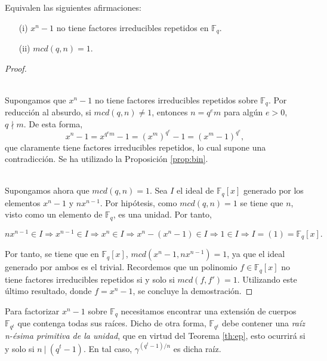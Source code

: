\begin{proposicion}
Equivalen las siguientes afirmaciones:
\begin{enumerate}
    \item[(i)]$x^n-1$ no tiene factores irreducibles repetidos en $\mathbb{F}_q$.
    \item[(ii)] $mcd(q,n) = 1$.
\end{enumerate}
\end{proposicion}

\begin{proof}
   \phantom{a}\\ \\  

    Supongamos que $x^n-1$ no tiene factores irreducibles repetidos sobre $\mathbb{F}_q$. Por reducción al absurdo, si $mcd(q,n) \neq 1$, entonces $n = q^em$ para algún $e > 0$, $q \nmid m$. De esta forma, 
    $$x^n - 1 = x^{q^em} - 1 = (x^{m})^{q^e} - 1 = (x^m - 1)^{q^e},$$ que claramente tiene factores irreducibles repetidos, lo cual supone una contradicción. Se ha utilizado la Proposición \ref{prop:bin}.
    \phantom{a}\\ \\  

    Supongamos ahora que $mcd(q,n) = 1$. Sea $I$ el ideal de $\mathbb{F}_q[x]$ generado por los elementos $x^n - 1$ y $nx^{n-1}$. Por hipótesis, como $mcd(q,n) = 1$ se tiene que $n$, visto como un elemento de $\mathbb{F}_q$, es una unidad. Por tanto,

    $$nx^{n-1} \in I \Rightarrow x^{n-1} \in I \Rightarrow x^{n} \in I \Rightarrow x^n - (x^n - 1) \in I \Rightarrow 1 \in I \Rightarrow I = (1) =\mathbb{F}_q[x] .$$

    Por tanto, se tiene que en $\mathbb{F}_q[x]$, $mcd(x^n-1,nx^{n-1}) = 1$, ya que el ideal generado por ambos es el trivial. Recordemos que un polinomio $f\in \mathbb{F}_q[x]$ no tiene factores irreducibles repetidos si y solo si $mcd(f,f') = 1$. Utilizando este último resultado, donde $f = x^n - 1$, se concluye la demostración.

\end{proof}

Para factorizar $x^n - 1$ sobre $\mathbb{F}_q$ necesitamos encontrar una extensión de cuerpos $\mathbb{F}_{q^t}$ que contenga todas sus raíces. Dicho de otra forma, $\mathbb{F}_{q^t}$ debe contener una \emph{raíz n-ésima primitiva de la unidad}, que en virtud del Teorema \ref{th:ep}, esto ocurrirá si y solo si $ n \ | \ (q^t - 1)$. En tal caso, $\gamma^{(q^t - 1)/n}$ es dicha raíz.


